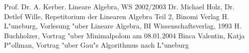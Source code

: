 \documentclass[a4paper]{article}
\begin{document}
\begin{thebibliography}{99}
 Prof. Dr. A. Kerber. Lineare Algebra, WS 2002/2003
 Dr. Michael Holz, Dr. Detlef Wille, Repetitorium der Linearen Algebra  Teil 2, Binomi Verlag
 H. L"uneburg, Vorlesung "uber Lineare Algebra, BI Wissenschaftsverlag, 1993
 H. Buchholzer, Vortrag "uber Minimalpolom am 08.01.2004
 Binca Valentin, Katja P"ollman, Vortrag "uber Gau"s Algorithmus nach L"uneburg
\end{thebibliography}
\end{document}
